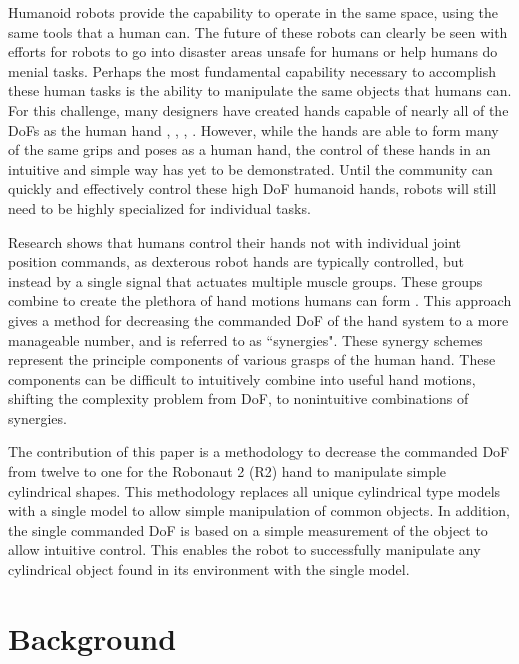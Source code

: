 \documentclass[runningheads,a4paper]{llncs}
\begin{document}
Humanoid robots provide the capability to operate in the same space, using the same tools that a human can. The future of these robots can clearly be seen with efforts for robots to go into disaster areas unsafe for humans \cite{fukushima_robots} or help humans do menial tasks. Perhaps the most fundamental capability necessary to accomplish these human tasks is the ability to manipulate the same objects that humans can. For this challenge, many designers have created hands capable of nearly all of the DoFs as the human hand \cite{r2_hand}, \cite{DRL}, \cite{hrp3}, \cite{softhand}. However, while the hands are able to form many of the same grips and poses as a human hand, the control of these hands in an intuitive and simple way has yet to be demonstrated. Until the community can quickly and effectively control these high DoF humanoid hands, robots will still need to be highly specialized for individual tasks. \par
Research shows that humans control their hands not with individual joint position commands, as dexterous robot hands are typically controlled, but instead by a single signal that actuates multiple muscle groups. These groups combine to create the plethora of hand motions humans can form \cite{Santello} \cite{neuro}. This approach gives a method for decreasing the commanded DoF of the hand system to a more manageable number, and is referred to as ``synergies". These synergy schemes represent the principle components of various grasps of the human hand. These components can be difficult to intuitively combine into useful hand motions, shifting the complexity problem from DoF, to nonintuitive combinations of synergies. \par
The contribution of this paper is a methodology to decrease the commanded DoF from twelve to one for the Robonaut 2 (R2) hand to manipulate simple cylindrical shapes. This methodology replaces all unique cylindrical type models with a single model to allow simple manipulation of common objects. In addition, the single commanded DoF is based on a simple measurement of the object to allow intuitive control. This enables the robot to successfully manipulate any cylindrical object found in its environment with the single model.

\section{Background}
\end{document}
